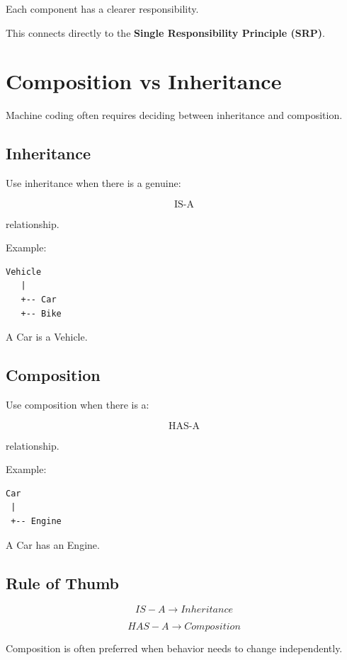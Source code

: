 \documentclass[12pt,a4paper]{article}
\begin{document}
Each component has a clearer responsibility.

This connects directly to the \textbf{Single Responsibility Principle (SRP)}.

\section{Composition vs Inheritance}

Machine coding often requires deciding between inheritance and composition.

\subsection{Inheritance}

Use inheritance when there is a genuine:

\[
\boxed{\text{IS-A}}
\]

relationship.

Example:

\begin{verbatim}
Vehicle
   |
   +-- Car
   +-- Bike
\end{verbatim}

A Car is a Vehicle.

\subsection{Composition}

Use composition when there is a:

\[
\boxed{\text{HAS-A}}
\]

relationship.

Example:

\begin{verbatim}
Car
 |
 +-- Engine
\end{verbatim}

A Car has an Engine.

\subsection{Rule of Thumb}

\[
IS-A \rightarrow Inheritance
\]

\[
HAS-A \rightarrow Composition
\]

Composition is often preferred when behavior needs to change independently.

\end{document}
